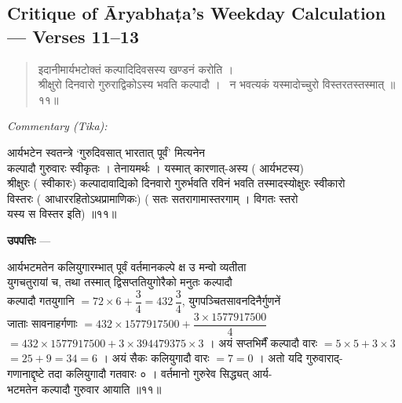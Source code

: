 \documentclass[11pt,a4paper]{article}
\newcommand{\skt}[1]{{\devanagarifont\color{sktcolor} #1}}
\newenvironment{shloka}{%
  \begin{quote}%
  \smallskip%
  \devanagarifont\color{sktcolor}%
}{%
  \smallskip%
  \end{quote}%
}
\newenvironment{tika}{%
  \smallskip%
  \noindent\textit{Commentary (Tika):}\par%
  \smallskip%
  \hindifont\small%
}{%
  \par\smallskip%
}
\newenvironment{upapatti}{%
  \smallskip%
  \noindent\textbf{\devanagarifont उपपत्तिः} — \devanagarifont\small%
}{%
  \par\smallskip%
}
\begin{document}
\subsection*{Critique of Āryabhaṭa's Weekday Calculation — Verses 11--13}

\begin{shloka}
\skt{इदानीमार्यभटोक्तं कल्पादिदिवसस्य खण्डनं करोति ।}\\[0.5em]
\skt{श्रीक्षुरो दिनवारो गुरुराद्विकोऽस्य भवति कल्पादौ ।}\
\skt{न भवत्यकं यस्मादोच्चुरो विस्तरतस्तस्मात्} ॥११॥
\end{shloka}

\vspace{0.3cm}
\begin{tika}
\skt{आर्यभटेन स्वतन्त्रे `गुरुदिवसात् भारतात् पूर्वं' मित्यनेन}\\
\skt{कल्पादौ गुरुवारः स्वीकृतः । तेनायमर्थः । यस्मात् कारणात्-अस्य} (\skt{आर्यभटस्य})\\
\skt{श्रीक्षुरः} (\skt{स्वीकारः}) \skt{कल्पादावाद्यिको दिनवारो गुरुर्भवति रविनं भवति तस्मादस्योक्षुरः स्वीकारो}\\
\skt{विस्तरः} (\skt{आधाररहितोऽथप्रामाणिकः}) (\skt{सतः सतरागामास्तरगाम् । विगतः स्तरो}\\
\skt{यस्य स विस्तर इति}) ॥११॥
\end{tika}

\vspace{0.5cm}

\begin{upapatti}
\skt{आर्यभटमतेन कलियुगारम्भात् पूर्वं वर्तमानकल्पे क्ष उ मन्वो व्यतीता}\\
\skt{युगचतुरायां च, तथा तस्मात् द्विसप्ततियुगोरैको मनुतः कल्पादौ}\\
\skt{कल्पादौ गतयुगानि} $= 72 \times 6 + \dfrac{3}{4} = 432\,\dfrac{3}{4}$, \skt{युगपञ्चितसावनदिनैर्गुणनें}\\
\skt{जाताः सावनाहर्गणाः} $= 432 \times 1577917500 + \dfrac{3 \times 1577917500}{4}$\\
$= 432 \times 1577917500 + 3 \times 394479375 \times 3$ । \skt{अयं सप्तभिर्मैं कल्पादौ वारः} $= 5 \times 5 + 3 \times 3$\\
$= 25 + 9 = 34 = 6$ । \skt{अयं सैकः कलियुगादौ वारः} $= 7 = 0$ । \skt{अतो यदि गुरुवाराद्-}\\
\skt{गणानाद्दृष्टे तदा कलियुगादौ गतवारः ० । वर्तमानो गुरुरेव सिद्ध्यत् आर्य-}\\
\skt{भटमतेन कल्पादौ गुरुवार आयाति} ॥११॥
\end{upapatti}
\end{document}
